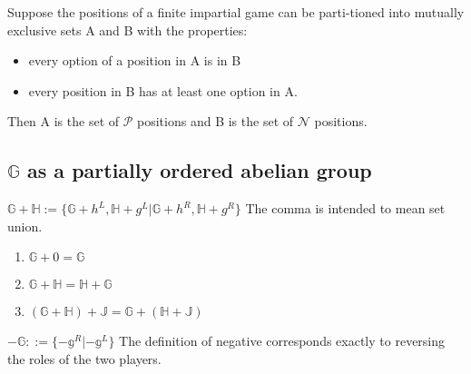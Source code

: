 \documentclass[12pt]{beamer}
\begin{document}
\begin{frame}
\begin{theorem}
Suppose the positions of a finite impartial game can be parti-tioned into mutually exclusive sets A and B with the properties:
\begin{itemize}
\item every option of a position in A is in B
\item every position in B has at least one option in A.
\end{itemize}
Then A is the set of $\mathcal{P}$ positions and B is the set of $\mathcal{N}$ positions.
\end{theorem}

\end{frame}


\subsection{$\mathbb{G}$ as a partially ordered abelian group}
\begin{frame}
\begin{definition}
$ \mathbb{G+H} :=
\{\mathbb{G} + {h^\textit{L}},\mathbb{H} + {g^\textit{L}} | \mathbb{G} + {h^\textit{R}},\mathbb{H}+{g^\textit{R}}\}$\break
The comma is intended to mean set union.
\end{definition}

\pause
 \begin{theorem}
 \begin{enumerate}
     \item $\mathbb{G}+0=\mathbb{G}$
     \item $\mathbb{G+H = H+G}$
     \item $\mathbb{(G+H)+J = G+(H+J)}$
 \end{enumerate}

 \end{theorem}
\pause
 \begin{definition}
 $\mathbb{-G ::= \{{-g^\textit{R}}|{-g^\textit{L}}\} }$\break
 The definition of negative corresponds exactly to reversing the roles of
the two players.
 \end{definition}
\end{frame}
\end{document}
